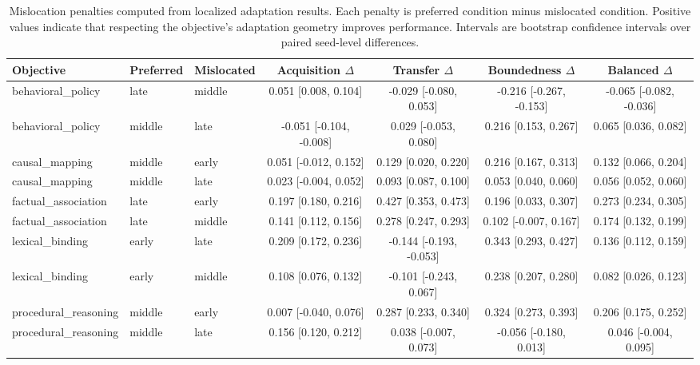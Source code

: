 \begin{table}[t]
\centering
\scriptsize
\setlength{\tabcolsep}{3pt}
\begin{tabular}{lllcccc}
\toprule
Objective & Preferred & Mislocated & Acquisition $\Delta$ & Transfer $\Delta$ & Boundedness $\Delta$ & Balanced $\Delta$ \\
\midrule
behavioral\_policy & late & middle & 0.051 [0.008, 0.104] & -0.029 [-0.080, 0.053] & -0.216 [-0.267, -0.153] & -0.065 [-0.082, -0.036] \\
behavioral\_policy & middle & late & -0.051 [-0.104, -0.008] & 0.029 [-0.053, 0.080] & 0.216 [0.153, 0.267] & 0.065 [0.036, 0.082] \\
causal\_mapping & middle & early & 0.051 [-0.012, 0.152] & 0.129 [0.020, 0.220] & 0.216 [0.167, 0.313] & 0.132 [0.066, 0.204] \\
causal\_mapping & middle & late & 0.023 [-0.004, 0.052] & 0.093 [0.087, 0.100] & 0.053 [0.040, 0.060] & 0.056 [0.052, 0.060] \\
factual\_association & late & early & 0.197 [0.180, 0.216] & 0.427 [0.353, 0.473] & 0.196 [0.033, 0.307] & 0.273 [0.234, 0.305] \\
factual\_association & late & middle & 0.141 [0.112, 0.156] & 0.278 [0.247, 0.293] & 0.102 [-0.007, 0.167] & 0.174 [0.132, 0.199] \\
lexical\_binding & early & late & 0.209 [0.172, 0.236] & -0.144 [-0.193, -0.053] & 0.343 [0.293, 0.427] & 0.136 [0.112, 0.159] \\
lexical\_binding & early & middle & 0.108 [0.076, 0.132] & -0.101 [-0.243, 0.067] & 0.238 [0.207, 0.280] & 0.082 [0.026, 0.123] \\
procedural\_reasoning & middle & early & 0.007 [-0.040, 0.076] & 0.287 [0.233, 0.340] & 0.324 [0.273, 0.393] & 0.206 [0.175, 0.252] \\
procedural\_reasoning & middle & late & 0.156 [0.120, 0.212] & 0.038 [-0.007, 0.073] & -0.056 [-0.180, 0.013] & 0.046 [-0.004, 0.095] \\
\bottomrule
\end{tabular}
\caption{Mislocation penalties computed from localized adaptation results. Each penalty is preferred condition minus mislocated condition. Positive values indicate that respecting the objective's adaptation geometry improves performance. Intervals are bootstrap confidence intervals over paired seed-level differences.}
\label{tab:mislocation-penalties}
\end{table}
